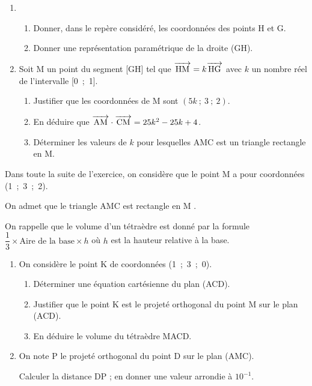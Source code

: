 \documentclass[10pt,a4paper]{article}
\newcommand{\vect}[1]{\overrightarrow{\,\mathstrut#1\,}}
\begin{document}
\begin{enumerate}
\item 
	\begin{enumerate}
		\item Donner, dans le repère considéré, les coordonnées des points H et G.
		\item Donner une représentation paramétrique de la droite (GH).
	\end{enumerate}	
\item Soit M un point du segment [GH] tel que $\vect{\text{HM}} =k\vect{\text{HG}}$ avec $k$ un nombre réel de l'intervalle [0~;~1].
	\begin{enumerate}
		\item Justifier que les coordonnées de M sont $(5k~;~3~;~2)$.
		\item En déduire que $\vect{\text{AM}} \cdot \vect{\text{CM}} = 25k^2  - 25k + 4$.
		\item Déterminer les valeurs de $k$ pour lesquelles AMC est un triangle rectangle en
M.
	\end{enumerate}
\end{enumerate}	

Dans toute la suite de l'exercice, on considère que le point M a pour coordonnées (1~;~3~;~2).

On admet que le triangle AMC est rectangle en M .

On rappelle que le volume d'un tétraèdre est donné par la formule $\dfrac13 \times\text{Aire de la base}  \times h$ où $h$ est la hauteur relative à la base.

\begin{enumerate}[resume]
\item On considère le point K de coordonnées (1~;~3~;~0).
	\begin{enumerate}
		\item Déterminer une équation cartésienne du plan (ACD).
		\item Justifier que le point K est le projeté orthogonal du point M sur le plan (ACD).
		\item En déduire le volume du tétraèdre MACD.
	\end{enumerate}	
\item On note P le projeté orthogonal du point D sur le plan (AMC).

Calculer la distance DP ; en donner une valeur arrondie à $10^{-1}$.
\end{enumerate}
\newpage
\hypertarget{AmeriSud2}{}
\end{document}
